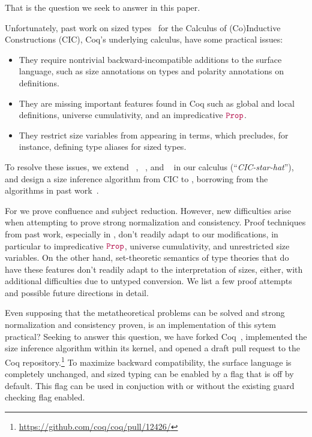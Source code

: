 \noindent That is the question we seek to answer in this paper.

Unfortunately, past work on sized types~\citep{cic-hat, cic-hat-minus,cc-hat-omega} for the Calculus of (Co)\-Inductive Constructions (CIC), Coq's underlying calculus, have some practical issues:

\begin{itemize}
    \item They require nontrivial backward-incompatible additions to the surface language,
      such as size annotations on \cofixpoint types and polarity annotations on \coinductive definitions.
    \item They are missing important features found in Coq such as global and local definitions,
      universe cumulativity, and an impredicative $\Prop$.
    \item They restrict size variables from appearing in terms, which precludes, for instance,
      defining type aliases for sized types.
\end{itemize}

To resolve these issues, we extend \CIChat~\citep{cic-hat}, \CIChatminus~\citep{cic-hat-minus-nat,cic-hat-minus}, and \CChatomega~\citep{cc-hat-omega} in our calculus \textbf{\lang} (``\emph{CIC-star-hat}''),
and design a size inference algorithm from CIC to \lang,
borrowing from the algorithms in past work~\citep{f-hat, cic-hat, cc-hat-omega}.

For \lang we prove confluence and subject reduction.
However, new difficulties arise when attempting to prove strong normalization and consistency.
Proof techniques from past work, especially in \citet{cic-hat-minus}, don't readily adapt to our modifications,
in particular to impredicative $\Prop$, universe cumulativity, and unrestricted size variables.
On the other hand, set-theoretic semantics of type theories that do have these features don't readily adapt to the interpretation of sizes, either,
with additional difficulties due to untyped conversion.
We list a few proof attempts and possible future directions in detail.

Even supposing that the metatheoretical problems can be solved and strong normalization and consistency proven,
is an implementation of this sytem practical?
Seeking to answer this question, we have forked Coq~\citep{impl}, implemented the size inference algorithm within its kernel,
and opened a draft pull request to the Coq repository.\footnote{\url{https://github.com/coq/coq/pull/12426/}}
To maximize backward compatibility, the surface language is completely unchanged,
and sized typing can be enabled by a flag that is off by default.
This flag can be used in conjuction with or without the existing guard checking flag enabled.

